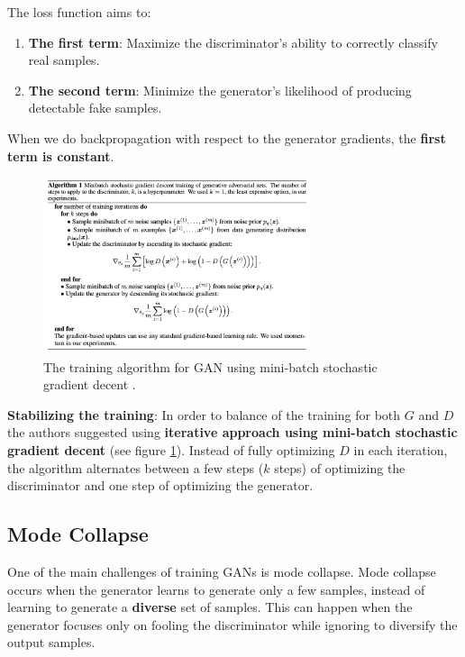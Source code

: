 The loss function aims to:

\begin{enumerate}
    \item \textbf{The first term}: Maximize the discriminator's ability to correctly classify real samples.
    \item \textbf{The second term}: Minimize the generator's likelihood of producing detectable fake samples.
\end{enumerate}

When we do backpropagation with respect to the generator gradients, the \textbf{first term is constant}.

\begin{figure}
    \centering
    \includegraphics[width=0.7\textwidth]{images/gan/gan_training.png}
    \caption{The training algorithm for GAN using mini-batch stochastic gradient decent \cite{gan}.}
    \label{fig:gan_training}
\end{figure}

\textbf{Stabilizing the training}: In order to balance of the training for both $G$ and $D$ the authors suggested using \textbf{iterative approach using mini-batch stochastic gradient decent} (see figure \ref{fig:gan_training}). Instead of fully optimizing $D$ in each iteration, the algorithm alternates between a few steps ($k$ steps) of optimizing the discriminator and one step of optimizing the generator.





\subsection{Mode Collapse}
\label{gan_mode_collapse}

One of the main challenges of training GANs is mode collapse. Mode collapse occurs when the generator learns to generate only a few samples, instead of learning to generate a \textbf{diverse} set of samples. This can happen when the generator focuses only on fooling the discriminator while ignoring to diversify the output samples.

